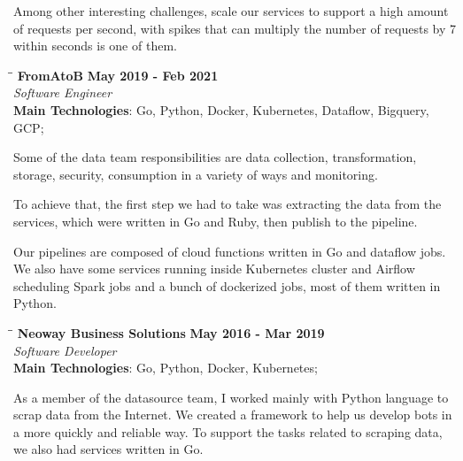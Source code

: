 \documentclass[margin]{res}
\begin{document}
\begin{resume}
Among other interesting challenges, scale our services to support a high amount of requests per second, with spikes that can multiply the number of requests by 7 within seconds is one of them.


\vspace{-0.1in}
   \begin{tabbing}
   \hspace{2.3in}\= \hspace{1.7in}\= \kill %
    \textbf{FromAtoB}    \>\>\textbf{May 2019 - Feb 2021}\\
    \textit{Software Engineer}\\
    \textbf{Main Technologies}: Go, Python, Docker, Kubernetes, Dataflow, Bigquery, GCP;
   \end{tabbing}\vspace{-20pt}      %
    \vspace{2mm}

Some of the data team responsibilities are data collection, transformation, storage, security, consumption in a variety of ways and monitoring.

To achieve that, the first step we had to take was extracting the data from the services, which were written in Go and Ruby, then publish to the pipeline.

Our pipelines are composed of cloud functions written in Go and dataflow jobs.
We also have some services running inside Kubernetes cluster and Airflow scheduling Spark jobs and a bunch of dockerized jobs, most of them written in Python.


\vspace{-0.1in}
   \begin{tabbing}
   \hspace{2.3in}\= \hspace{1.7in}\= \kill %
    \textbf{Neoway Business Solutions}    \>\>\textbf{May 2016 - Mar 2019}\\
    \textit{Software Developer}\\
    \textbf{Main Technologies}: Go, Python, Docker, Kubernetes;
   \end{tabbing}\vspace{-20pt}      %
    \vspace{2mm}

As a member of the datasource team, I worked mainly with Python language to scrap data from the Internet. We created a framework to help us develop bots in a more quickly and reliable way.
To support the tasks related to scraping data, we also had services written in Go.



\end{resume}
\end{document}
